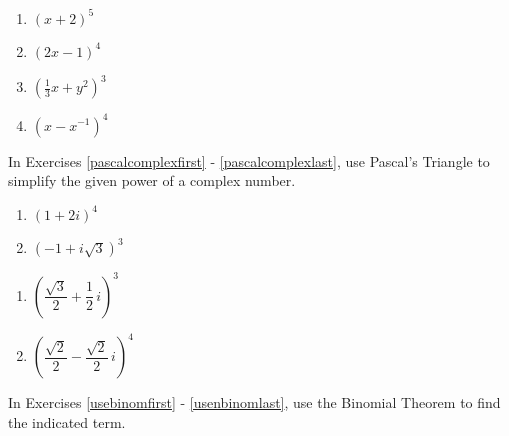 \begin{multicols}{4}
\begin{enumerate}
\setcounter{enumi}{\value{HW}}


\item  $(x+2)^5$ \label{pascalfirst}

\item  $(2x-1)^4$

\item  $\left(\frac{1}{3} x +  y^2\right)^3$

\item  $\left(x - x^{-1} \right)^{4}$ \label{pascallast}

\setcounter{HW}{\value{enumi}}
\end{enumerate}
\end{multicols}

In Exercises \ref{pascalcomplexfirst} - \ref{pascalcomplexlast},   use Pascal's Triangle to simplify the given power of a complex number.

\begin{multicols}{2}
\begin{enumerate}
\setcounter{enumi}{\value{HW}}

\item  $(1+2i)^4$ \label{pascalcomplexfirst}

\item  $\left(-1 + i \sqrt{3}\right)^3$

\setcounter{HW}{\value{enumi}}
\end{enumerate}
\end{multicols}

\begin{multicols}{2}
\begin{enumerate}
\setcounter{enumi}{\value{HW}}

\item  $\left(\dfrac{\sqrt{3}}{2} +  \dfrac{1}{2}\, i\right)^3$

\item  $\left(\dfrac{\sqrt{2}}{2} - \dfrac{\sqrt{2}}{2} \, i\right)^4$  \label{pascalcomplexlast}

\setcounter{HW}{\value{enumi}}
\end{enumerate}
\end{multicols}

In Exercises \ref{usebinomfirst} - \ref{usenbinomlast}, use the Binomial Theorem to find the indicated term.

